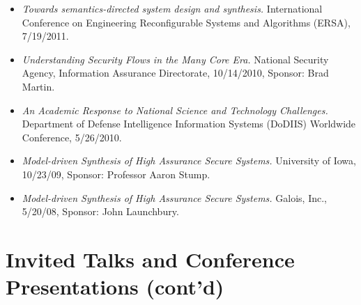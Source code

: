 \documentclass[11pt]{article}
\begin{document}
\begin{itemize}[leftmargin=0mm]
\item[]{\it Towards semantics-directed system design and synthesis.}
International Conference on
  Engineering Reconfigurable Systems and Algorithms (ERSA), 7/19/2011.

\item[]{\it Understanding Security Flows in the Many Core Era.}
National Security Agency, Information Assurance Directorate, 
10/14/2010, Sponsor: Brad Martin.

\item[]{\it An Academic Response to National Science and Technology Challenges.}
Department of Defense Intelligence Information Systems (DoDIIS) Worldwide Conference, 5/26/2010.

\item[]{\it Model-driven Synthesis of High Assurance Secure Systems.} University of Iowa, 10/23/09, Sponsor: Professor Aaron Stump.

\item[]{\it Model-driven Synthesis of High Assurance Secure Systems.} Galois, Inc., 5/20/08, Sponsor: John Launchbury.
\end{itemize}

\section{Invited Talks and Conference Presentations (cont'd)}
\end{document}

